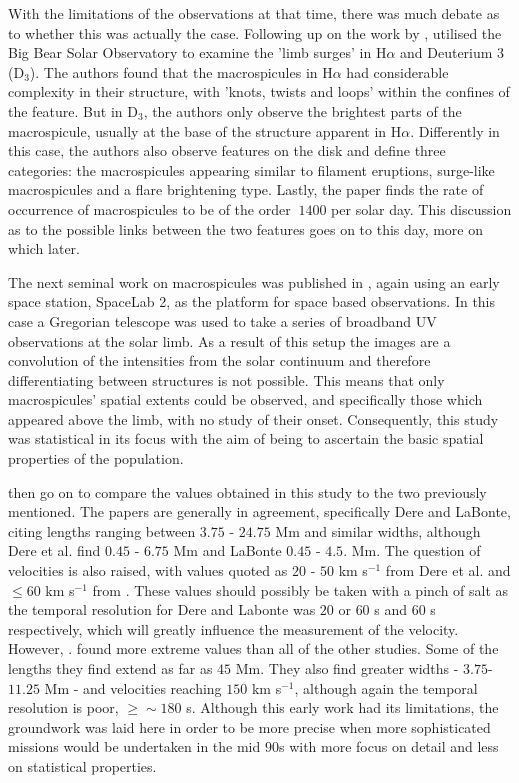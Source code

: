 With the limitations of the observations at that time, there was much debate as to whether this was actually the case. 
Following up on the work by \cite{Bohlin1975}, \cite{LaBonte79} utilised the Big Bear Solar Observatory to examine the 'limb surges' in H$\alpha$ and Deuterium 3 (D$_3$).
The authors found that the macrospicules in H$\alpha$ had considerable complexity in their structure, with 'knots, twists and loops' within the confines of the feature.
But in D$_3$, the authors only observe the brightest parts of the macrospicule, usually at the base of the structure apparent in H$\alpha$.
Differently in this case, the authors also observe features on the disk and define three categories: the macrospicules appearing similar to filament eruptions, surge-like macrospicules and a flare brightening type.
Lastly, the paper finds the rate of occurrence of macrospicules to be of the order $~1400$ per solar day. 
This discussion as to the possible links between the two features goes on to this day, more on which later.

The next seminal work on macrospicules was published in \cite{Dere89}, again using an early space station, SpaceLab 2, as the platform for space based observations.
In this case a Gregorian telescope was used to take a series of broadband UV observations at the solar limb.
As a result of this setup the images are a convolution of the intensities from the solar continuum and therefore differentiating between structures is not possible.
This means that only macrospicules' spatial extents could be observed, and specifically those which appeared above the limb, with no study of their onset.
Consequently, this study was statistical in its focus with the aim of being to ascertain the basic spatial properties of the population.

\cite{Dere89} then go on to compare the values obtained in this study to the two previously mentioned.
The papers are generally in agreement, specifically Dere and LaBonte, citing lengths ranging between $3.75$ - $24.75$ Mm and similar widths, although Dere et al. find $0.45$ - $6.75$ Mm and LaBonte $0.45$ - $4.5$. Mm.
The question of velocities is also raised, with values quoted as $20$ - $50$ km s${^{-1}}$ from Dere et al. and $\leq60$ km s${^{-1}}$ from \cite{LaBonte79}.
These values should possibly be taken with a pinch of salt as the temporal resolution for Dere and Labonte was $20$ or $60$ s and $60$ s respectively, which will greatly influence the measurement of the velocity.
However, \cite{Bohlin1975}. found more extreme values than all of the other studies.
Some of the lengths they find extend as far as $45$ Mm.
They also find greater widths - $3.75$-$11.25$ Mm - and velocities reaching $150$ km s${^{-1}}$, although again the temporal resolution is poor, $\geq \sim 180$ s.
Although this early work had its limitations, the groundwork was laid here in order to be more precise when more sophisticated missions would be undertaken in the mid $90$s with more focus on detail and less on statistical properties.

